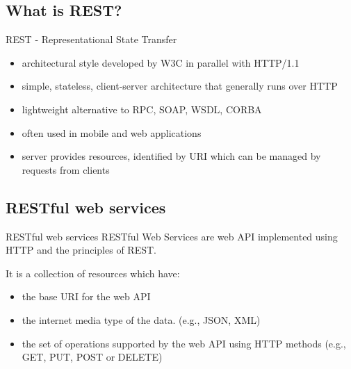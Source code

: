 \subsection{What is REST?}
	\begin{frame}{REST - Representational State Transfer}
		    	\begin{itemize}
				  \item architectural style developed by W3C in parallel with HTTP/1.1
				  \item simple, stateless, client-server architecture that generally runs over HTTP 
				  \item lightweight alternative to RPC, SOAP, WSDL, CORBA
				  \item often used in mobile and web applications
				  \item server provides resources, identified by URI which can be managed by requests from clients
				\end{itemize}
	\end{frame}
	
\subsection{RESTful web services} 
	
	\begin{frame}{RESTful web services}	
		RESTful Web Services are web API implemented using HTTP and the principles of REST.	
		
		\vspace{1cm}
		
		It is a collection of resources which have:
		\begin{itemize}
		  \item the base URI for the web API
		  \item the internet media type of the data. (e.g., JSON, XML)
		  \item the set of operations supported by the web API using HTTP methods (e.g., GET, PUT, POST or DELETE)
		\end{itemize}
	\end{frame}	
	
